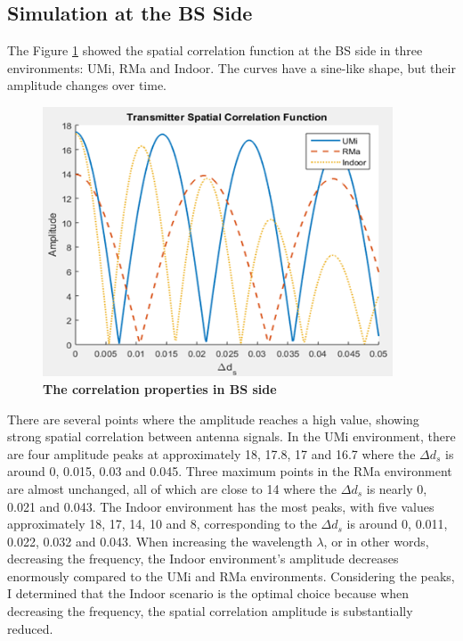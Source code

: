 \documentclass{article} %
\begin{document}
\subsection{Simulation at the BS Side}

The Figure \ref{figure2} showed the spatial correlation function at the BS side in three environments: UMi, RMa and Indoor. The curves have a sine-like shape, but their amplitude changes over time.

\begin{figure}[!ht]
    \centering
    \includegraphics[height=8cm]{Images/figure2.png}
    \caption[The correlation properties in BS side~\cite{final_exam}]{\bfseries \fontsize{12pt}{0pt}\selectfont The correlation properties in BS side~\cite{final_exam}}
    \label{figure2}
\end{figure}

There are several points where the amplitude reaches a high value, showing strong spatial correlation between antenna signals. In the UMi environment, there are four amplitude peaks at approximately 18, 17.8, 17 and 16.7 where the $\Delta d_s$ is around 0, 0.015, 0.03 and 0.045. Three maximum points in the RMa environment are almost unchanged, all of which are close to 14 where the $\Delta d_s$ is nearly 0, 0.021 and 0.043. The Indoor environment has the most peaks, with five values approximately 18, 17, 14, 10 and 8, corresponding to the $\Delta d_s$ is around 0, 0.011, 0.022, 0.032 and 0.043. When increasing the wavelength $\lambda$, or in other words, decreasing the frequency, the Indoor environment’s amplitude decreases enormously compared to the UMi and RMa environments. Considering the peaks, I determined that the Indoor scenario is the optimal choice because when decreasing the frequency, the spatial correlation amplitude is substantially reduced.
\end{document}
